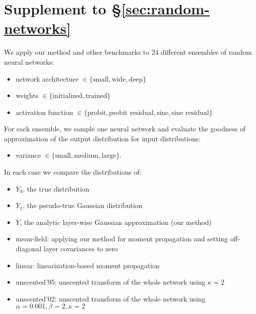 \documentclass{article}
\begin{document}
\clearpage
\section{Supplement to \S\ref{sec:random-networks}}
\label{app:random-neural-networks}
We apply our method and other benchmarks to 24 different ensembles of random neural networks:
\begin{itemize}
  \item network architecture \( \in \{\text{small}, \text{wide}, \text{deep}\} \)
  \item weights \( \in \{\text{initialized}, \text{trained}\} \)
  \item activation function \( \in \{\text{probit}, \text{probit residual}, \text{sine}, \text{sine residual}\} \)
\end{itemize}
For each ensemble, we sample one neural network and evaluate the goodness of approximation of the output distribution for input distributions: 
\begin{itemize}
  \item variance \( \in \{\text{small}, \text{medium}, \text{large}\} \).
\end{itemize}
In each case we compare the distributions of:
\begin{itemize}
  \item \(Y_0\), the true distribution
  \item \(Y_1\), the pseudo-true Gaussian distribution
  \item \(Y\), the analytic layer-wise Gaussian approximation (our method)
  \item mean-field: applying our method for moment propagation and setting off-diagonal layer covariances to zero
  \item linear: linearization-based moment propagation
  \item unscented'95: unscented transform of the whole network using \(\kappa=2\)
  \item unscented'02: unscented transform of the whole network using \(\alpha=0.001, \beta=2, \kappa=2\)
\end{itemize}
\end{document}
